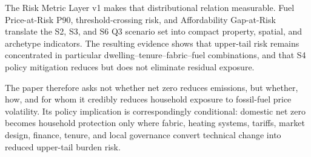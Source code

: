 The Risk Metric Layer v1 makes that distributional relation measurable. Fuel Price-at-Risk P90, threshold-crossing risk, and Affordability Gap-at-Risk translate the S2, S3, and S6 Q3 scenario set into compact property, spatial, and archetype indicators. The resulting evidence shows that upper-tail risk remains concentrated in particular dwelling--tenure--fabric--fuel combinations, and that S4 policy mitigation reduces but does not eliminate residual exposure.

The paper therefore asks not whether net zero reduces emissions, but whether, how, and for whom it credibly reduces household exposure to fossil-fuel price volatility. Its policy implication is correspondingly conditional: domestic net zero becomes household protection only where fabric, heating systems, tariffs, market design, finance, tenure, and local governance convert technical change into reduced upper-tail burden risk.
